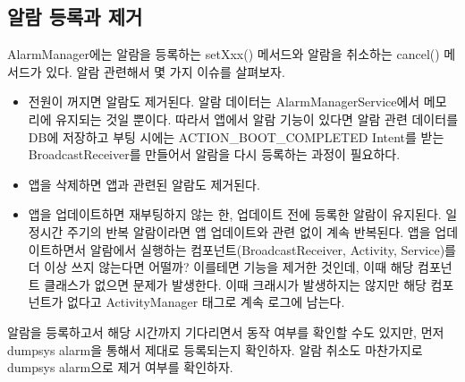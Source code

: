 \subsection{알람 등록과 제거}
AlarmManager에는 알람을 등록하는 setXxx() 메서드와 알람을 취소하는 cancel() 메서드가 있다. 알람 관련해서 몇 가지 이슈를 살펴보자.

\begin{itemize}
\item 전원이 꺼지면 알람도 제거된다. 알람 데이터는 AlarmManagerService에서 메모리에 유지되는 것일 뿐이다. 따라서 앱에서 알람 기능이 있다면 알람 관련 데이터를 DB에 저장하고 부팅 시에는 ACTION\_BOOT\_COMPLETED Intent를 받는 BroadcastReceiver를 만들어서 알람을 다시 등록하는 과정이 필요하다.

\item 앱을 삭제하면 앱과 관련된 알람도 제거된다.

\item 앱을 업데이트하면 재부팅하지 않는 한, 업데이트 전에 등록한 알람이 유지된다. 
일정시간 주기의 반복 알람이라면 앱 업데이트와 관련 없이 계속 반복된다. 앱을 업데이트하면서 알람에서 실행하는 컴포넌트(BroadcastReceiver, Activity, Service)를 더 이상 쓰지 않는다면 어떨까? 이를테면 기능을 제거한 것인데, 이때 해당 컴포넌트 클래스가 없으면 문제가 발생한다. 
이때 크래시가 발생하지는 않지만 해당 컴포넌트가 없다고 ActivityManager 태그로 계속 로그에 남는다.
\end{itemize}

알람을 등록하고서 해당 시간까지 기다리면서 동작 여부를 확인할 수도 있지만, 먼저 dumpsys alarm을 통해서 제대로 등록되는지 확인하자. 
알람 취소도 마찬가지로 dumpsys alarm으로 제거 여부를 확인하자.



